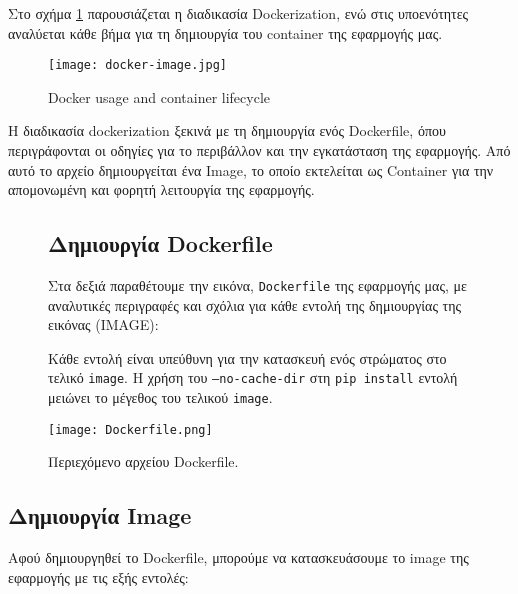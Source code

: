 \documentclass{article}  %
\begin{document}
Στο σχήμα \ref{fig:docker} παρουσιάζεται η διαδικασία  {Dockerization}, ενώ στις υποενότητες αναλύεται κάθε βήμα για τη δημιουργία του  {container} της εφαρμογής μας.


\begin{figure}[H]
    \centering
    \texttt{[image: docker-image.jpg]}
    \caption{ {Docker usage and container lifecycle}}
    \label{fig:docker}
\end{figure}


Η διαδικασία  {dockerization} ξεκινά με τη δημιουργία ενός  {Dockerfile}, όπου περιγράφονται οι οδηγίες για το περιβάλλον και την εγκατάσταση της εφαρμογής. Από αυτό το αρχείο δημιουργείται ένα  {Image}, το οποίο εκτελείται ως  {Container} για την απομονωμένη και φορητή λειτουργία της εφαρμογής\cite{raj2015learning}\cite{chelladhurai2017learning}.

\noindent

\begin{figure}[ht!]
\centering
\begin{minipage}[t]{0.32\textwidth}
    \vspace{0pt}
    \subsection{Δημιουργία Dockerfile}

    Στα δεξιά παραθέτουμε την εικόνα, \texttt{Dockerfile} της εφαρμογής μας, με αναλυτικές περιγραφές και σχόλια για κάθε εντολή της δημιουργίας της εικόνας (IMAGE):

    Κάθε εντολή είναι υπεύθυνη για την κατασκευή ενός στρώματος στο τελικό \texttt{image}. Η χρήση του \texttt{--no-cache-dir} στη \texttt{pip install} εντολή μειώνει το μέγεθος του τελικού \texttt{image}.
\end{minipage}
\hfill
\begin{minipage}[t]{0.64\textwidth}
    \vspace{0pt}
    \centering
    \texttt{[image: Dockerfile.png]}
    \caption{Περιεχόμενο αρχείου Dockerfile.}
    \label{fig:Dockerfile}
\end{minipage}
\end{figure}



\subsection{Δημιουργία  {Image}}
Αφού δημιουργηθεί το  {Dockerfile}, μπορούμε να κατασκευάσουμε το  {image} της εφαρμογής με τις εξής εντολές:
\end{document}

